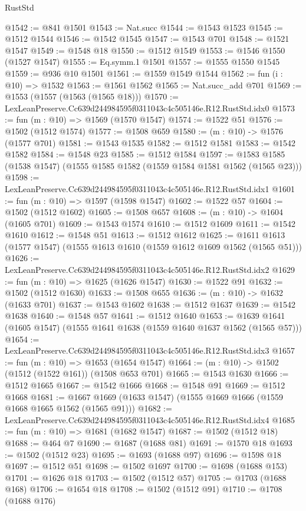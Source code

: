 \begin{lexlean}{RustStd}
\begin{coremodule}
@1542 := @841 @1501
@1543 := Nat.succ
@1544 := @1543 @1523
@1545 := @1512 @1544
@1546 := @1542 @1545
@1547 := @1543 @701
@1548 := @1521 @1547
@1549 := @1548 @18
@1550 := @1512 @1549
@1553 := @1546 @1550 (@1527 @1547)
@1555 := Eq.symm.{1} @1501
@1557 := @1555 @1550 @1545
@1559 := @936 @10 @1501
@1561 := @1559 @1549 @1544
@1562 := fun (i : @10) => @1532
@1563 := @1561 @1562
@1565 := Nat.succ_add @701
@1569 := @1553 (@1557 (@1563 (@1565 @18)))
@1570 := LexLeanPreserve.Cc639d244984595f0311043c4c505146e.R12.RustStd.idx0
@1573 := fun (m : @10) => @1569 (@1570 @1547)
@1574 := @1522 @51
@1576 := @1502 (@1512 @1574)
@1577 := @1508 @659
@1580 := (m : @10) -> @1576 (@1577 @701)
@1581 := @1543 @1535
@1582 := @1512 @1581
@1583 := @1542 @1582
@1584 := @1548 @23
@1585 := @1512 @1584
@1597 := @1583 @1585 (@1538 @1547) (@1555 @1585 @1582 (@1559 @1584 @1581 @1562 (@1565 @23)))
@1598 := LexLeanPreserve.Cc639d244984595f0311043c4c505146e.R12.RustStd.idx1
@1601 := fun (m : @10) => @1597 (@1598 @1547)
@1602 := @1522 @57
@1604 := @1502 (@1512 @1602)
@1605 := @1508 @657
@1608 := (m : @10) -> @1604 (@1605 @701)
@1609 := @1543 @1574
@1610 := @1512 @1609
@1611 := @1542 @1610
@1612 := @1548 @51
@1613 := @1512 @1612
@1625 := @1611 @1613 (@1577 @1547) (@1555 @1613 @1610 (@1559 @1612 @1609 @1562 (@1565 @51)))
@1626 := LexLeanPreserve.Cc639d244984595f0311043c4c505146e.R12.RustStd.idx2
@1629 := fun (m : @10) => @1625 (@1626 @1547)
@1630 := @1522 @91
@1632 := @1502 (@1512 @1630)
@1633 := @1508 @655
@1636 := (m : @10) -> @1632 (@1633 @701)
@1637 := @1543 @1602
@1638 := @1512 @1637
@1639 := @1542 @1638
@1640 := @1548 @57
@1641 := @1512 @1640
@1653 := @1639 @1641 (@1605 @1547) (@1555 @1641 @1638 (@1559 @1640 @1637 @1562 (@1565 @57)))
@1654 := LexLeanPreserve.Cc639d244984595f0311043c4c505146e.R12.RustStd.idx3
@1657 := fun (m : @10) => @1653 (@1654 @1547)
@1664 := (m : @10) -> @1502 (@1512 (@1522 @161)) (@1508 @653 @701)
@1665 := @1543 @1630
@1666 := @1512 @1665
@1667 := @1542 @1666
@1668 := @1548 @91
@1669 := @1512 @1668
@1681 := @1667 @1669 (@1633 @1547) (@1555 @1669 @1666 (@1559 @1668 @1665 @1562 (@1565 @91)))
@1682 := LexLeanPreserve.Cc639d244984595f0311043c4c505146e.R12.RustStd.idx4
@1685 := fun (m : @10) => @1681 (@1682 @1547)
@1687 := @1502 (@1512 @18)
@1688 := @464 @7
@1690 := @1687 (@1688 @81)
@1691 := @1570 @18
@1693 := @1502 (@1512 @23)
@1695 := @1693 (@1688 @97)
@1696 := @1598 @18
@1697 := @1512 @51
@1698 := @1502 @1697
@1700 := @1698 (@1688 @153)
@1701 := @1626 @18
@1703 := @1502 (@1512 @57)
@1705 := @1703 (@1688 @168)
@1706 := @1654 @18
@1708 := @1502 (@1512 @91)
@1710 := @1708 (@1688 @176)

\end{coremodule}
\end{lexlean}
